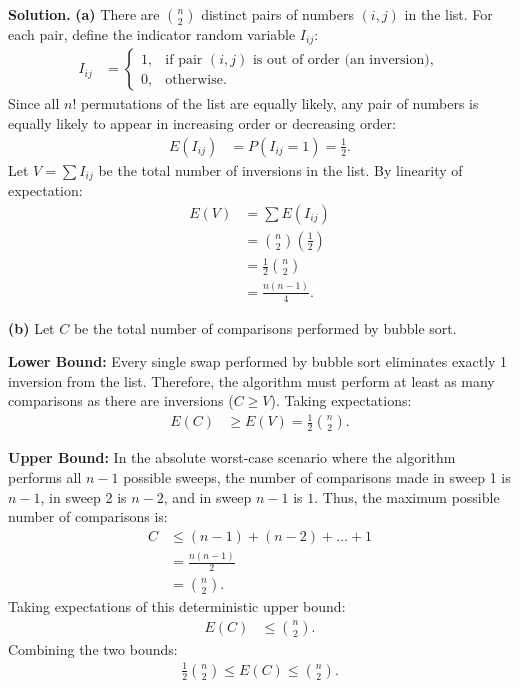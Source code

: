 \documentclass[11pt,a4paper]{article}
\begin{document}
\noindent \textbf{Solution.} \textbf{(a)} There are $\binom{n}{2}$ distinct pairs of numbers $(i, j)$ in the list. For each pair, define the indicator random variable $I_{ij}$:
\begin{align*}
I_{ij} &= \begin{cases}
1, & \text{if pair } (i, j) \text{ is out of order (an inversion)}, \\
0, & \text{otherwise}.
\end{cases}
\end{align*}
Since all $n!$ permutations of the list are equally likely, any pair of numbers is equally likely to appear in increasing order or decreasing order:
\begin{align*}
E(I_{ij}) &= P(I_{ij} = 1) = \frac{1}{2}.
\end{align*}
Let $V = \sum I_{ij}$ be the total number of inversions in the list. By linearity of expectation:
\begin{align*}
E(V) &= \sum E(I_{ij}) \\
&= \binom{n}{2} \left(\frac{1}{2}\right) \\
&= \frac{1}{2}\binom{n}{2} \\
&= \frac{n(n-1)}{4}.
\end{align*}

\vspace{4pt}
\noindent \textbf{(b)} Let $C$ be the total number of comparisons performed by bubble sort. 

\textbf{Lower Bound:} Every single swap performed by bubble sort eliminates exactly 1 inversion from the list. Therefore, the algorithm must perform at least as many comparisons as there are inversions ($C \ge V$). Taking expectations:
\begin{align*}
E(C) &\ge E(V) = \frac{1}{2}\binom{n}{2}.
\end{align*}

\textbf{Upper Bound:} In the absolute worst-case scenario where the algorithm performs all $n-1$ possible sweeps, the number of comparisons made in sweep 1 is $n-1$, in sweep 2 is $n-2$, and in sweep $n-1$ is $1$. Thus, the maximum possible number of comparisons is:
\begin{align*}
C &\le (n - 1) + (n - 2) + \dots + 1 \\
&= \frac{n(n-1)}{2} \\
&= \binom{n}{2}.
\end{align*}
Taking expectations of this deterministic upper bound:
\begin{align*}
E(C) &\le \binom{n}{2}.
\end{align*}
Combining the two bounds:
\begin{align*}
\frac{1}{2}\binom{n}{2} \le E(C) \le \binom{n}{2}.
\end{align*}
\end{document}
